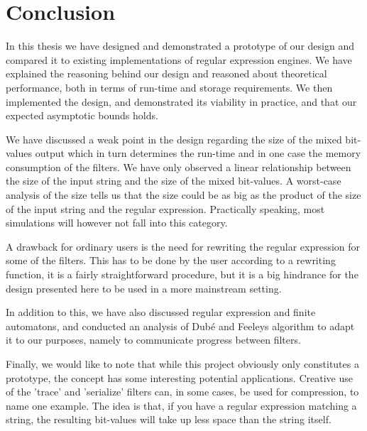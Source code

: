 \section{Conclusion}
\label{sec:conclusion}

In this thesis we have designed and demonstrated a prototype of our
design and compared it to existing implementations of regular
expression engines. We have explained the reasoning behind our design
and reasoned about theoretical performance, both in terms of run-time
and storage requirements. We then implemented the design, and
demonstrated its viability in practice, and that our expected
asymptotic bounds holds.  

We have discussed a weak point in the design regarding the size of the
mixed bit-values output which in turn determines the run-time and in
one case the memory consumption of the filters. We have only observed
a linear relationship between the size of the input string and the
size of the mixed bit-values. A worst-case analysis of the size tells
us that the size could be as big as the product of the size of the
input string and the regular expression. Practically speaking, most
simulations will however not fall into this category.

A drawback for ordinary users is the need for rewriting the regular
expression for some of the filters. This has to be done by the user
according to a rewriting function, it is a fairly straightforward
procedure, but it is a big hindrance for the design presented here to
be used in a more mainstream setting.

In addition to this, we have also discussed regular expression and
finite automatons, and conducted an analysis of Dub\'{e} and Feeleys
algorithm to adapt it to our purposes, namely to communicate progress
between filters. 

Finally, we would like to note that while this project obviously only
constitutes a prototype, the concept has some interesting potential
applications. Creative use of the 'trace' and 'serialize' filters can,
in some cases, be used for compression, to name one example. The idea
is that, if you have a regular expression matching a string, the
resulting bit-values will take up less space than the string itself.
